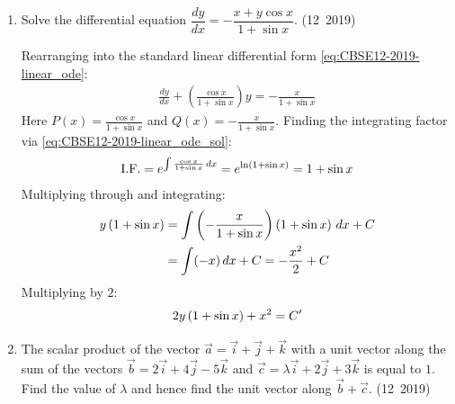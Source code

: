 \begin{enumerate}[label=\thesubsection.\arabic*, ref=\thesubsection.\theenumi]
\item Solve the differential equation $\dfrac{dy}{dx} = -\dfrac{x + y\cos x}{1 + \sin x}$.
\hfill (12~2019)

\solution
Rearranging into the standard linear differential form \eqref{eq:CBSE12-2019-linear_ode}:
\begin{align}
	\frac{dy}{dx} + \left(\frac{\cos x}{1 + \sin x}\right)y = -\frac{x}{1 + \sin x}
\end{align}
Here $P(x) = \frac{\cos x}{1 + \sin x}$ and $Q(x) = -\frac{x}{1 + \sin x}$.
Finding the integrating factor via \eqref{eq:CBSE12-2019-linear_ode_sol}:
\begin{align}
	\text{I.F.} = e^{\int \frac{\cos x}{1 + \sin x}\,dx} = e^{\ln\left(1 + \sin x\right)} = 1 + \sin x
\end{align}
Multiplying through and integrating:
\begin{align}
	y\left(1 + \sin x\right) &= \int \left(-\frac{x}{1 + \sin x}\right)\left(1 + \sin x\right)\,dx + C \\
	&= \int (-x)\,dx + C = -\frac{x^2}{2} + C
\end{align}
Multiplying by $2$:
\begin{align}
	2y\left(1 + \sin x\right) + x^2 = C'
\end{align}



\item The scalar product of the vector $\vec{a} = \vec{i} + \vec{j} + \vec{k}$ with a unit vector along the sum of the vectors $\vec{b} = 2\vec{i} + 4\vec{j} - 5\vec{k}$ and $\vec{c} = \lambda\vec{i} + 2\vec{j} + 3\vec{k}$ is equal to $1$. Find the value of $\lambda$ and hence find the unit vector along $\vec{b} + \vec{c}$.
\hfill (12~2019)


\end{enumerate}
